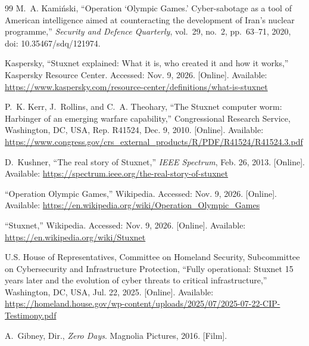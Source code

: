 \begin{thebibliography}{99}
M.~A. Kamiński, ``Operation `Olympic Games.' Cyber-sabotage as a tool of American intelligence aimed at counteracting the development of Iran's nuclear programme,'' \emph{Security and Defence Quarterly}, vol.~29, no.~2, pp.~63--71, 2020, doi: 10.35467/sdq/121974.

Kaspersky, ``Stuxnet explained: What it is, who created it and how it works,'' Kaspersky Resource Center. Accessed: Nov. 9, 2026. [Online]. Available: \url{https://www.kaspersky.com/resource-center/definitions/what-is-stuxnet}

P.~K. Kerr, J.~Rollins, and C.~A. Theohary, ``The Stuxnet computer worm: Harbinger of an emerging warfare capability,'' Congressional Research Service, Washington, DC, USA, Rep. R41524, Dec. 9, 2010. [Online]. Available: \url{https://www.congress.gov/crs_external_products/R/PDF/R41524/R41524.3.pdf}

D.~Kushner, ``The real story of Stuxnet,'' \emph{IEEE Spectrum}, Feb. 26, 2013. [Online]. Available: \url{https://spectrum.ieee.org/the-real-story-of-stuxnet}

``Operation Olympic Games,'' Wikipedia. Accessed: Nov. 9, 2026. [Online]. Available: \url{https://en.wikipedia.org/wiki/Operation_Olympic_Games}

``Stuxnet,'' Wikipedia. Accessed: Nov. 9, 2026. [Online]. Available: \url{https://en.wikipedia.org/wiki/Stuxnet}

U.S. House of Representatives, Committee on Homeland Security, Subcommittee on Cybersecurity and Infrastructure Protection, ``Fully operational: Stuxnet 15 years later and the evolution of cyber threats to critical infrastructure,'' Washington, DC, USA, Jul. 22, 2025. [Online]. Available: \url{https://homeland.house.gov/wp-content/uploads/2025/07/2025-07-22-CIP-Testimony.pdf}

A.~Gibney, Dir., \emph{Zero Days}. Magnolia Pictures, 2016. [Film].

\end{thebibliography}




% 
% 
